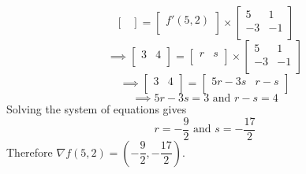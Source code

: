 \documentclass{article}
\theoremstyle{plain} %
\numberwithin{thm}{section} %
\theoremstyle{definition}
\begin{document}
\begin{question}{29}
\[\begin{bmatrix}
            \end{bmatrix}
            =
            \begin{bmatrix}
                 f'(5,2) \\
            \end{bmatrix}
            \times 
            \begin{bmatrix}
                5 &  1 \\
                -3 &  -1 \\
            \end{bmatrix}
        \]
        \[
            \implies \begin{bmatrix}
                3 &  4 \\
            \end{bmatrix}
            = 
            \begin{bmatrix}
                r &  s \\
            \end{bmatrix}
            \times 
            \begin{bmatrix}
                5 &  1 \\
                -3 &  -1 \\
            \end{bmatrix}
        \]
        \[
            \implies \begin{bmatrix}
                3 &  4 \\
            \end{bmatrix}
            = 
            \begin{bmatrix}
                5r-3s &  r-s \\
            \end{bmatrix}
        \]
        \[
            \implies 5r - 3s = 3 \text{ and } r - s = 4
        \]
        Solving the system of equations gives
        \[
            r = -\frac{9}{2} \text{ and } s = -\frac{17}{2}
        \]
        Therefore \(\nabla f(5,2) = \left( -\dfrac{9}{2}, -\dfrac{17}{2} \right)\).
    \end{question}
\end{document}
